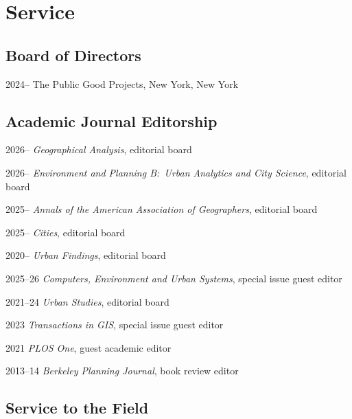 \documentclass[11pt,a4paper]{report} %
\begin{document}
\section*{Service}

\subsection*{Board of Directors}

\begin{tablist}

\item[2024--]    \tab{}The Public Good Projects, New York, New York

\end{tablist}

\subsection*{Academic Journal Editorship}

\begin{tablist}

\item[2026--]   \tab{}\textit{Geographical Analysis}, editorial board
\item[2026--]   \tab{}\textit{Environment and Planning B:\ Urban Analytics and City Science}, editorial board
\item[2025--]   \tab{}\textit{Annals of the American Association of Geographers}, editorial board
\item[2025--]   \tab{}\textit{Cities}, editorial board
\item[2020--]   \tab{}\textit{Urban Findings}, editorial board
\item[2025--26] \tab{}\textit{Computers, Environment and Urban Systems}, special issue guest editor  %
\item[2021--24] \tab{}\textit{Urban Studies}, editorial board
\item[2023]     \tab{}\textit{Transactions in GIS}, special issue guest editor  %
\item[2021]     \tab{}\textit{PLOS One}, guest academic editor
\item[2013--14] \tab{}\textit{Berkeley Planning Journal}, book review editor

\end{tablist}

\subsection*{Service to the Field}
\end{document}

